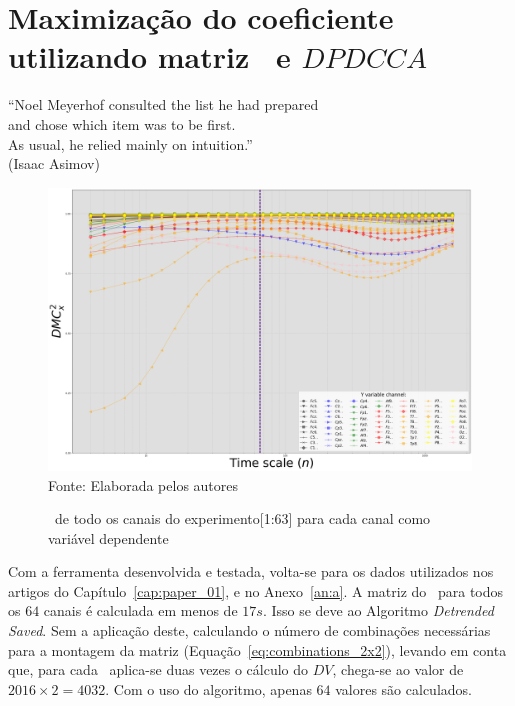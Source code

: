 \chapter{ Maximização do coeficiente \dmc utilizando matriz \pdcca~e $DPDCCA$}\label{cap:paper_03}



\begin{flushright}
    ``Noel Meyerhof consulted the list he had prepared \\
    and chose which item was to be first. \\
    As usual, he relied mainly on intuition.''\\[10px]
    (Isaac Asimov)
    \end{flushright}



\begin{figure}[!htb]
	\centering
	\caption{\dmc~de todo os canais do experimento[1:63] para cada canal como variável dependente}
	\includegraphics[width=.95\textwidth]{./Figures/art_03/dmc_all.png}
	\\{\footnotesize Fonte: Elaborada pelos autores}
	\label{fig:a03_dmc_total}
\end{figure}

Com a ferramenta desenvolvida e testada, volta-se para os dados utilizados nos artigos do Capítulo~\ref{cap:paper_01}, e no Anexo~\ref{an:a}. A matriz do \pdcca~para todos os $64$ canais é calculada em menos de $17s$. Isso se deve ao Algoritmo \emph{Detrended Saved}. Sem a aplicação deste, calculando o número de combinações necessárias para a montagem da matriz (Equação~\ref{eq:combinations_2x2}), levando em conta que, para cada \dcca~aplica-se duas vezes o cálculo do $DV$, chega-se ao valor de $2016 \times 2 = 4032$. Com o uso do algoritmo, apenas $64$ valores são calculados.

